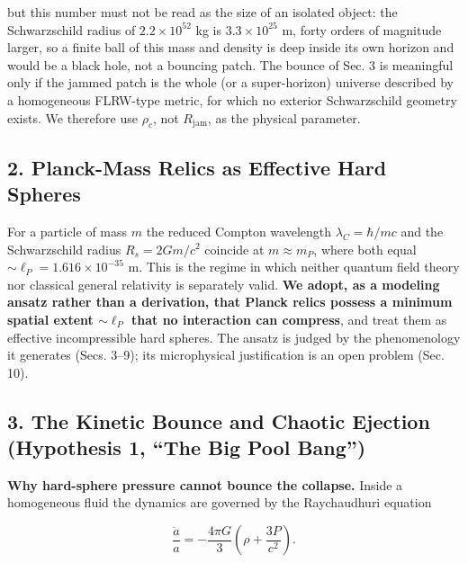 \documentclass[
]{article}
\begin{document}
but this number must not be read as the size of an isolated object: the
Schwarzschild radius of \(2.2\times10^{52}\) kg is \(3.3\times10^{25}\)
m, forty orders of magnitude larger, so a finite ball of this mass and
density is deep inside its own horizon and would be a black hole, not a
bouncing patch. The bounce of Sec. 3 is meaningful only if the jammed
patch is the whole (or a super-horizon) universe described by a
homogeneous FLRW-type metric, for which no exterior Schwarzschild
geometry exists. We therefore use \(\rho_c\), not \(R_{\text{jam}}\), as
the physical parameter.

\hypertarget{planck-mass-relics-as-effective-hard-spheres}{%
\subsection{\texorpdfstring{\textbf{2. Planck-Mass Relics as Effective
Hard
Spheres}}{2. Planck-Mass Relics as Effective Hard Spheres}}\label{planck-mass-relics-as-effective-hard-spheres}}

For a particle of mass \(m\) the reduced Compton wavelength
\(\lambda_C = \hbar/mc\) and the Schwarzschild radius \(R_s = 2Gm/c^2\)
coincide at \(m \approx m_P\), where both equal
\(\sim\!\ell_P = 1.616\times10^{-35}\) m. This is the regime in which
neither quantum field theory nor classical general relativity is
separately valid. \textbf{We adopt, as a modeling ansatz rather than a
derivation, that Planck relics possess a minimum spatial extent
\(\sim\!\ell_P\) that no interaction can compress}, and treat them as
effective incompressible hard spheres. The ansatz is judged by the
phenomenology it generates (Secs. 3--9); its microphysical justification
is an open problem (Sec. 10).

\hypertarget{the-kinetic-bounce-and-chaotic-ejection-hypothesis-1-the-big-pool-bang}{%
\subsection{\texorpdfstring{\textbf{3. The Kinetic Bounce and Chaotic
Ejection (Hypothesis 1, ``The Big Pool
Bang'')}}{3. The Kinetic Bounce and Chaotic Ejection (Hypothesis 1, ``The Big Pool Bang'')}}\label{the-kinetic-bounce-and-chaotic-ejection-hypothesis-1-the-big-pool-bang}}

\textbf{Why hard-sphere pressure cannot bounce the collapse.} Inside a
homogeneous fluid the dynamics are governed by the Raychaudhuri equation

\[\frac{\ddot{a}}{a} = -\frac{4\pi G}{3} \left( \rho + \frac{3P}{c^2} \right).\]
\end{document}
